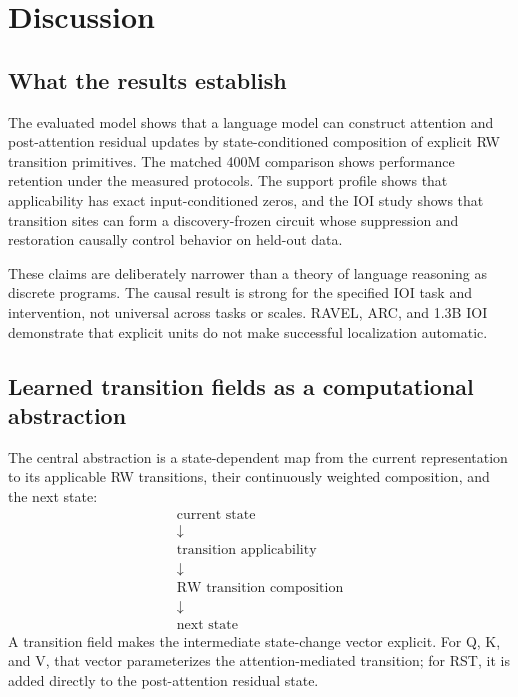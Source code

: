 \documentclass{article}
\begin{document}
\section{Discussion}
\label{sec:discussion}

\subsection{What the results establish}

The evaluated model shows that a language model can construct attention and
post-attention residual updates by state-conditioned composition of explicit
RW transition primitives. The matched 400M comparison shows performance
retention under the measured protocols. The support profile shows that
applicability has exact input-conditioned zeros, and the IOI study shows that
transition sites can form a discovery-frozen circuit whose suppression and
restoration causally control behavior on held-out data.

These claims are deliberately narrower than a theory of language reasoning as
discrete programs. The causal result is strong for the specified IOI task and
intervention, not universal across tasks or scales. RAVEL, ARC, and 1.3B IOI
demonstrate that explicit units do not make successful localization automatic.

\subsection{Learned transition fields as a computational abstraction}

The central abstraction is a state-dependent map from the current
representation to its applicable RW transitions, their continuously weighted
composition, and the next state:
\[
\begin{array}{c}
\text{current state}\\[-0.15em]
\downarrow\\[-0.15em]
\text{transition applicability}\\[-0.15em]
\downarrow\\[-0.15em]
\text{RW transition composition}\\[-0.15em]
\downarrow\\[-0.15em]
\text{next state}
\end{array}
\]
A transition field makes the intermediate state-change vector explicit. For
Q, K, and V, that vector parameterizes the attention-mediated transition; for
RST, it is added directly to the post-attention residual state.
\end{document}
